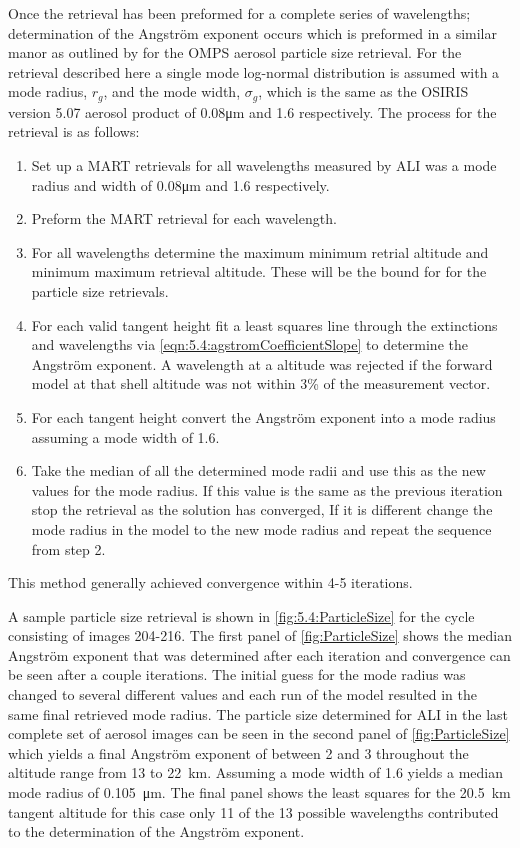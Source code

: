 Once the retrieval has been preformed for a complete series of wavelengths; determination of the Angstr\"{o}m exponent occurs which is preformed in a similar manor as outlined by \cite{Rault2013} for the OMPS aerosol particle size retrieval.  For the retrieval described here a single mode log-normal distribution is assumed with a mode radius, $r_{g}$, and the mode width, $\sigma_{g}$, which is the same as the OSIRIS version 5.07 aerosol product of 0.08\si{\micro\meter} and 1.6 respectively. The process for the retrieval is as follows:
\begin{enumerate}
    \item Set up a MART retrievals for all wavelengths measured by ALI was a mode radius and width of 0.08\si{\micro\meter} and 1.6 respectively.
    \item Preform the MART retrieval for each wavelength.
    \item For all wavelengths determine the maximum minimum retrial altitude and minimum maximum retrieval altitude. These will be the bound for for the particle size retrievals.
    \item For each valid tangent height fit a least squares line through the extinctions and wavelengths via \autoref{eqn:5.4:agstromCoefficientSlope} to determine the Angstr\"{o}m exponent. A wavelength at a altitude was rejected if the forward model at that shell altitude was not within 3\% of the measurement vector.
    \item For each tangent height convert the Angstr\"{o}m exponent into a mode radius assuming a mode width of 1.6.
    \item Take the median of all the determined mode radii and use this as the new values for the mode radius. If this value is the same as the previous iteration stop the retrieval as the solution has converged, If it is different change the mode radius in the model to the new mode radius and repeat the sequence from step 2.
\end{enumerate}
This method generally achieved convergence within 4-5 iterations.

A sample particle size retrieval is shown in \autoref{fig:5.4:ParticleSize} for the cycle consisting of images 204-216. The first panel of \autoref{fig:ParticleSize} shows the median Angstr\"{o}m exponent that was determined after each iteration and convergence can be seen after a couple iterations. The initial guess for the mode radius was changed to several different values and each run of the model resulted in the same final retrieved mode radius. The particle size determined for ALI in the last complete set of aerosol images can be seen in the second panel of \autoref{fig:ParticleSize} which yields a final Angstr\"{o}m exponent of between 2 and 3 throughout the altitude range from 13 to 22~km. Assuming a mode width of 1.6 yields a median mode radius of 0.105~\si{\micro\metre}. The final panel shows the least squares for the 20.5~km tangent altitude for this case only 11 of the 13 possible wavelengths contributed to the determination of the Angstr\"{o}m exponent.


